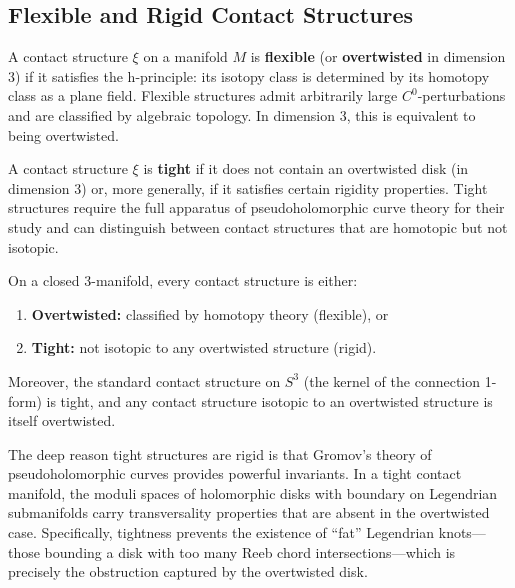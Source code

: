\subsection{Flexible and Rigid Contact Structures}

\begin{definition}
A contact structure $\xi$ on a manifold $M$ is \textbf{flexible} (or \textbf{overtwisted} in dimension 3) if it satisfies the h-principle: its isotopy class is determined by its homotopy class as a plane field. Flexible structures admit arbitrarily large $C^0$-perturbations and are classified by algebraic topology. In dimension 3, this is equivalent to being overtwisted.
\end{definition}

\begin{definition}
A contact structure $\xi$ is \textbf{tight} if it does not contain an overtwisted disk (in dimension 3) or, more generally, if it satisfies certain rigidity properties. Tight structures require the full apparatus of pseudoholomorphic curve theory for their study and can distinguish between contact structures that are homotopic but not isotopic.
\end{definition}

\begin{theorem}
On a closed 3-manifold, every contact structure is either:
\begin{enumerate}
    \item \textbf{Overtwisted:} classified by homotopy theory (flexible), or
    \item \textbf{Tight:} not isotopic to any overtwisted structure (rigid).
\end{enumerate}
Moreover, the standard contact structure on $S^3$ (the kernel of the connection 1-form) is tight, and any contact structure isotopic to an overtwisted structure is itself overtwisted.
\end{theorem}

\begin{remark}
The deep reason tight structures are rigid is that Gromov's theory of pseudoholomorphic curves provides powerful invariants. In a tight contact manifold, the moduli spaces of holomorphic disks with boundary on Legendrian submanifolds carry transversality properties that are absent in the overtwisted case. Specifically, tightness prevents the existence of ``fat'' Legendrian knots---those bounding a disk with too many Reeb chord intersections---which is precisely the obstruction captured by the overtwisted disk.
\end{remark}

